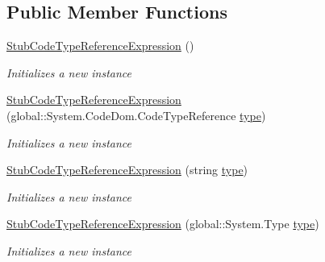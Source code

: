 \subsection*{Public Member Functions}
\begin{DoxyCompactItemize}
\item 
\hyperlink{class_system_1_1_code_dom_1_1_fakes_1_1_stub_code_type_reference_expression_a924fe5bf0e53985127e4bad91d9dae2a}{Stub\-Code\-Type\-Reference\-Expression} ()
\begin{DoxyCompactList}\small\item\em Initializes a new instance\end{DoxyCompactList}\item 
\hyperlink{class_system_1_1_code_dom_1_1_fakes_1_1_stub_code_type_reference_expression_a2d6805e7d5279ebfa0180a03b16a9094}{Stub\-Code\-Type\-Reference\-Expression} (global\-::\-System.\-Code\-Dom.\-Code\-Type\-Reference \hyperlink{jquery-1_810_82-vsdoc_8js_a3940565e83a9bfd10d95ffd27536da91}{type})
\begin{DoxyCompactList}\small\item\em Initializes a new instance\end{DoxyCompactList}\item 
\hyperlink{class_system_1_1_code_dom_1_1_fakes_1_1_stub_code_type_reference_expression_a60e93a610fe7f07792c842374b47e68d}{Stub\-Code\-Type\-Reference\-Expression} (string \hyperlink{jquery-1_810_82-vsdoc_8js_a3940565e83a9bfd10d95ffd27536da91}{type})
\begin{DoxyCompactList}\small\item\em Initializes a new instance\end{DoxyCompactList}\item 
\hyperlink{class_system_1_1_code_dom_1_1_fakes_1_1_stub_code_type_reference_expression_ae9e5a2182e4ba837101c14047423b110}{Stub\-Code\-Type\-Reference\-Expression} (global\-::\-System.\-Type \hyperlink{jquery-1_810_82-vsdoc_8js_a3940565e83a9bfd10d95ffd27536da91}{type})
\begin{DoxyCompactList}\small\item\em Initializes a new instance\end{DoxyCompactList}\end{DoxyCompactItemize}
